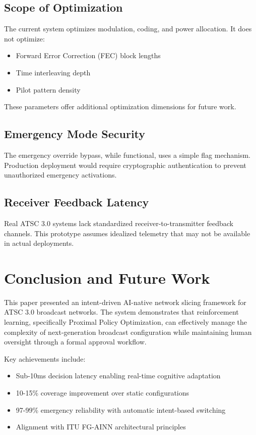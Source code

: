 \documentclass[conference]{IEEEtran}
\begin{document}
\subsection{Scope of Optimization}

The current system optimizes modulation, coding, and power allocation. It does not optimize:
\begin{itemize}
\item Forward Error Correction (FEC) block lengths
\item Time interleaving depth
\item Pilot pattern density
\end{itemize}

These parameters offer additional optimization dimensions for future work.

\subsection{Emergency Mode Security}

The emergency override bypass, while functional, uses a simple flag mechanism. Production deployment would require cryptographic authentication to prevent unauthorized emergency activations.

\subsection{Receiver Feedback Latency}

Real ATSC 3.0 systems lack standardized receiver-to-transmitter feedback channels. This prototype assumes idealized telemetry that may not be available in actual deployments.

\section{Conclusion and Future Work}

This paper presented an intent-driven AI-native network slicing framework for ATSC 3.0 broadcast networks. The system demonstrates that reinforcement learning, specifically Proximal Policy Optimization, can effectively manage the complexity of next-generation broadcast configuration while maintaining human oversight through a formal approval workflow.

Key achievements include:
\begin{itemize}
\item Sub-10ms decision latency enabling real-time cognitive adaptation
\item 10-15\% coverage improvement over static configurations
\item 97-99\% emergency reliability with automatic intent-based switching
\item Alignment with ITU FG-AINN architectural principles
\end{itemize}
\end{document}
